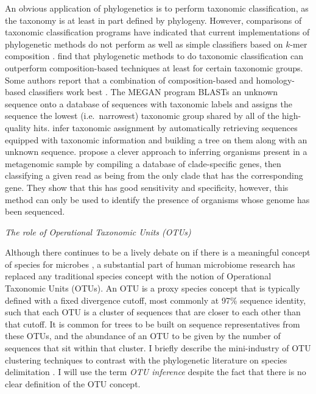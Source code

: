 \documentclass{amsart}
\renewcommand{\subsection}[1]{%
\bigskip
\begin{center}
\begin{large}
\normalfont\itshape #1
\end{large}
\end{center}}
\begin{document}
An obvious application of phylogenetics is to perform taxonomic classification, as the taxonomy is at least in part defined by phylogeny.
However, comparisons of taxonomic classification programs \citep{liu2008accurate,bazinet2012comparative} have indicated that current implementations of phylogenetic methods do not perform as well as simple classifiers based on $k$-mer composition \citep{wang2007naive,rosen2008metagenome}.
\citet{srinivasan2012bacterial} find that phylogenetic methods to do taxonomic classification can outperform composition-based techniques at least for certain taxonomic groups.
Some authors report that a combination of composition-based and homology-based classifiers work best \citep{brady2009phymm,parks2011classifying}.
The MEGAN program \citep{huson2007megan,huson2011integrative} BLASTs an unknown sequence onto a database of sequences with taxonomic labels and assigns the sequence the lowest (i.e.\ narrowest) taxonomic group shared by all of the high-quality hits.
\citet{munch2008statistical,munch2008fast} infer taxonomic assignment by automatically retrieving sequences equipped with taxonomic information and building a tree on them along with an unknown sequence.
\citet{segata2012metagenomic} propose a clever approach to inferring organisms present in a metagenomic sample by compiling a database of clade-specific genes, then classifying a given read as being from the only clade that has the corresponding gene.
They show that this has good sensitivity and specificity, however, this method can only be used to identify the presence of organisms whose genome has been sequenced.

\subsection{The role of Operational Taxonomic Units (OTUs)}
Although there continues to be a lively debate on if there is a meaningful concept of species for microbes \citep{bapteste2009prokaryotic,caro2012bacterial}, a substantial part of human microbiome research has replaced any traditional species concept with the notion of Operational Taxonomic Units (OTUs).
An OTU is a proxy species concept that is typically defined with a fixed divergence cutoff, most commonly at 97\% sequence identity, such that each OTU is a cluster of sequences that are closer to each other than that cutoff.
It is common for trees to be built on sequence representatives from these OTUs, and the abundance of an OTU to be given by the number of sequences that sit within that cluster.
I briefly describe the mini-industry of OTU clustering techniques to contrast with the phylogenetic literature on species delimitation \citep{pons2006sequence,yang2010bayesian}.
I will use the term \emph{OTU inference} despite the fact that there is no clear definition of the OTU concept.
\end{document}
